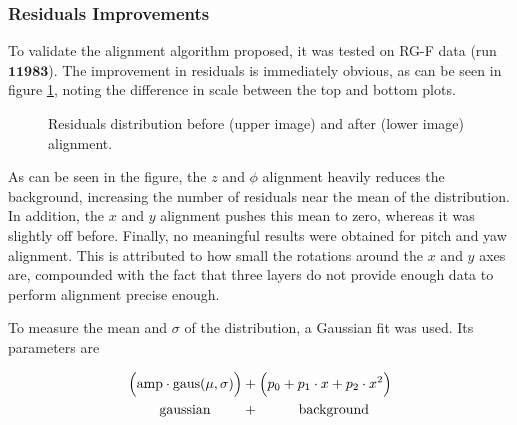 \subsubsection{Residuals Improvements}
    To validate the alignment algorithm proposed, it was tested on RG-F data (run $\mathbf{11983}$).
    The improvement in residuals is immediately obvious, as can be seen in figure \ref{fig::res_comparison}, noting the difference in scale between the top and bottom plots.
    
    \begin{figure}[t!]
        \centering{}
        \caption[Residuals distribution improvement.]{Residuals distribution before (upper image) and after (lower image) alignment.}
        \label{fig::res_comparison}
    \end{figure}
    
    As can be seen in the figure, the $z$ and $\phi$ alignment heavily reduces the background, increasing the number of residuals near the mean of the distribution.
    In addition, the $x$ and $y$ alignment pushes this mean to zero, whereas it was slightly off before.
    Finally, no meaningful results were obtained for pitch and yaw alignment.
    This is attributed to how small the rotations around the $x$ and $y$ axes are, compounded with the fact that three layers do not provide enough data to perform alignment precise enough.
    
    To measure the mean and $\sigma$ of the distribution, a Gaussian fit was used.
    Its parameters are
    
     \begin{align*}
        \Big( \text{amp} \cdot \text{gaus}(\mu, \sigma) \Big) &+ \Big( p_0 + p_1\cdot x + p_2\cdot x^2 \Big) \\
        \text{gaussian} \hspace{0.8cm} &+ \hspace{1cm} \text{background}
    \end{align*}


